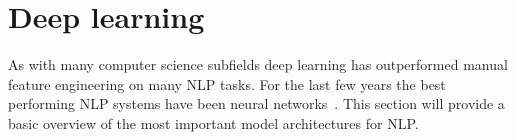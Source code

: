 \section{Deep learning}
\label{sec:deep_learning}

As with many computer science subfields deep learning has outperformed manual feature engineering on many NLP tasks.
For the last few years the best performing NLP systems have been neural networks~\citep{young2018recent}.
This section will provide a basic overview of the most important model architectures for NLP.

